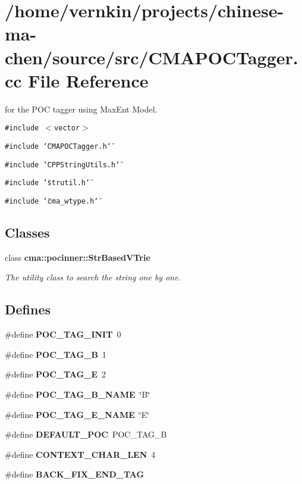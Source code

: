 \section{/home/vernkin/projects/chinese-ma-chen/source/src/CMAPOCTagger.cc File Reference}
\label{CMAPOCTagger_8cc}
for the POC tagger using MaxEnt Model.  


{\tt \#include $<$vector$>$}\par
{\tt \#include \char`\"{}CMAPOCTagger.h\char`\"{}}\par
{\tt \#include \char`\"{}CPPStringUtils.h\char`\"{}}\par
{\tt \#include \char`\"{}strutil.h\char`\"{}}\par
{\tt \#include \char`\"{}cma\_\-wtype.h\char`\"{}}\par
\subsection*{Classes}
\begin{CompactItemize}
\item 
class {\bf cma::pocinner::StrBasedVTrie}
\begin{CompactList}\small\item\em The utility class to search the string one by one. \item\end{CompactList}\end{CompactItemize}
\subsection*{Defines}
\begin{CompactItemize}
\item 
\#define \textbf{POC\_\-TAG\_\-INIT}~0\label{CMAPOCTagger_8cc_daae9f7e842ab812942e2c8884c5e9fa}

\item 
\#define \textbf{POC\_\-TAG\_\-B}~1\label{CMAPOCTagger_8cc_357022548e14d085e3c93f3906bcccd9}

\item 
\#define \textbf{POC\_\-TAG\_\-E}~2\label{CMAPOCTagger_8cc_9bdb1f3b570b2741da85e468e4d9f6c9}

\item 
\#define \textbf{POC\_\-TAG\_\-B\_\-NAME}~\char`\"{}B\char`\"{}\label{CMAPOCTagger_8cc_d335e18aeb001bbc74ae9991723398d9}

\item 
\#define \textbf{POC\_\-TAG\_\-E\_\-NAME}~\char`\"{}E\char`\"{}\label{CMAPOCTagger_8cc_a88cc556dbff3f12beefe55268610c91}

\item 
\#define \textbf{DEFAULT\_\-POC}~POC\_\-TAG\_\-B\label{CMAPOCTagger_8cc_491f74f500e8d8fba02698dc4035719c}

\item 
\#define \textbf{CONTEXT\_\-CHAR\_\-LEN}~4\label{CMAPOCTagger_8cc_0049a1c5aec42be9da7a350ef77884b8}

\item 
\#define \textbf{BACK\_\-FIX\_\-END\_\-TAG}
\end{CompactItemize}
